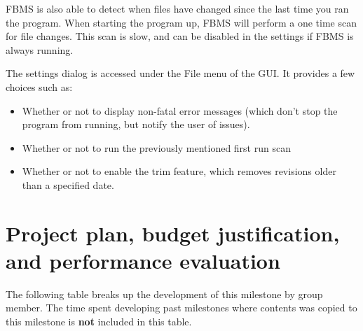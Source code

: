 \documentclass[12pt,a4paper]{article}
\begin{document}
FBMS is also able to detect when files have changed since the last time you ran the program. When starting the program up, FBMS will perform a one time scan for file changes. This scan is slow, and can be disabled in the settings if FBMS is always running.

The settings dialog is accessed under the File menu of the GUI. It provides a few choices such as:

\begin{itemize}
\item Whether or not to display non-fatal error messages (which don't stop the program from running, but notify the user of issues).
\item Whether or not to run the previously mentioned first run scan
\item Whether or not to enable the trim feature, which removes revisions older than a specified date.
\end{itemize}

\section{Project plan, budget justification, and performance evaluation}
The following table breaks up the development of this milestone by group member. The time spent developing past milestones where contents was copied to this milestone is \textbf{not} included in this table.
\end{document}
